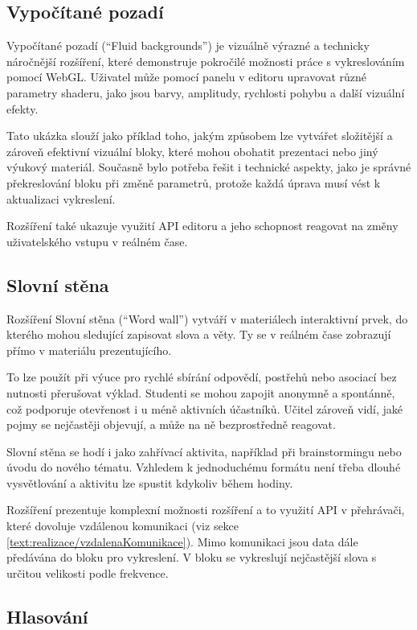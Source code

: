 \subsection{Vypočítané pozadí}

Vypočítané pozadí (\enquote{Fluid backgrounds}) je vizuálně výrazné a technicky náročnější rozšíření, které demonstruje pokročilé možnosti práce s vykreslováním pomocí WebGL.
Uživatel může pomocí panelu v editoru upravovat různé parametry shaderu, jako jsou barvy, amplitudy, rychlosti pohybu a další vizuální efekty.

Tato ukázka slouží jako příklad toho, jakým způsobem lze vytvářet složitější a zároveň efektivní vizuální bloky, které mohou obohatit prezentaci nebo jiný výukový materiál. 
Současně bylo potřeba řešit i technické aspekty, jako je správné překreslování bloku při změně parametrů, protože každá úprava musí vést k aktualizaci vykreslení.

Rozšíření také ukazuje využití API editoru a jeho schopnost reagovat na změny uživatelského vstupu v reálném čase.

\subsection{Slovní stěna}


Rozšíření Slovní stěna (\enquote{Word wall}) vytváří v materiálech interaktivní prvek, do kterého mohou sledující zapisovat slova a věty. 
Ty se v reálném čase zobrazují přímo v materiálu prezentujícího.

To lze použít při výuce pro rychlé sbírání odpovědí, postřehů nebo asociací bez nutnosti přerušovat výklad. 
Studenti se mohou zapojit anonymně a spontánně, což podporuje otevřenost i u méně aktivních účastníků. 
Učitel zároveň vidí, jaké pojmy se nejčastěji objevují, a může na ně bezprostředně reagovat.

Slovní stěna se hodí i jako zahřívací aktivita, například při brainstormingu nebo úvodu do nového tématu. 
Vzhledem k jednoduchému formátu není třeba dlouhé vysvětlování a aktivitu lze spustit kdykoliv během hodiny.

Rozšíření prezentuje komplexní možnosti rozšíření a to využití API v přehrávači, které dovoluje vzdálenou komunikaci (viz sekce \ref{text:realizace/vzdalenaKomunikace}).
Mimo komunikaci jsou data dále předávána do bloku pro vykreslení.
V bloku se vykreslují nejčastější slova s určitou velikosti podle frekvence.


\subsection{Hlasování}

